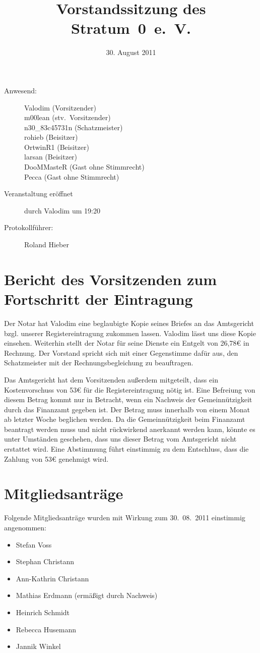 \documentclass[a4paper,12pt]{scrartcl}
\title{Vorstandssitzung des Stratum~0~e.~V.}
\date{30. August 2011}
\begin{document}
\maketitle

\begin{description}
 \item[Anwesend:] Valodim (Vorsitzender) \\
    m00lean (stv.~Vorsitzender) \\
    n30\_83c45731n (Schatzmeister) \\
    rohieb (Beisitzer) \\
    OrtwinR1 (Beisitzer) \\
    larsan (Beisitzer) \\
    DooMMasteR (Gast ohne Stimmrecht) \\
    Pecca (Gast ohne Stimmrecht)
  \item[Veranstaltung eröffnet] durch Valodim um 19:20
  \item[Protokollführer:] Roland Hieber
\end{description}

\section{Bericht des Vorsitzenden zum Fortschritt der Eintragung}
Der Notar hat Valodim eine beglaubigte Kopie seines Briefes an das Amtsgericht
bzgl. unserer Registereintragung zukommen lassen. Valodim lässt uns diese Kopie
einsehen. Weiterhin stellt der Notar für seine Dienste ein Entgelt von 26,78€ in
Rechnung. Der Vorstand spricht sich mit einer Gegenstimme dafür aus, den
Schatzmeister mit der Rechnungsbegleichung zu beauftragen.

Das Amtsgericht hat dem Vorsitzenden außerdem mitgeteilt, dass ein
Kostenvorschuss von 53€ für die Registereintragung nötig ist. Eine Befreiung
von diesem Betrag kommt nur in Betracht, wenn ein Nachweis der
Gemeinnützigkeit durch das Finanzamt gegeben ist. Der Betrag muss innerhalb von
einem Monat ab letzter Woche beglichen werden. Da die Gemeinnützigkeit beim
Finanzamt beantragt werden muss und nicht rückwirkend anerkannt werden kann,
könnte es unter Umständen geschehen, dass uns dieser Betrag vom Amtsgericht
nicht erstattet wird. Eine Abstimmung führt einstimmig zu dem Entschluss, dass
die Zahlung von 53€ genehmigt wird.

\section{Mitgliedsanträge}
Folgende Mitgliedsanträge wurden mit Wirkung zum 30.~08.~2011 einstimmig
angenommen:
\begin{itemize}
 \item Stefan Voss
 \item Stephan Christann
 \item Ann-Kathrin Christann
 \item Mathias Erdmann (ermäßigt durch Nachweis)
 \item Heinrich Schmidt
 \item Rebecca Husemann
 \item Jannik Winkel
\end{itemize}
\end{document}
